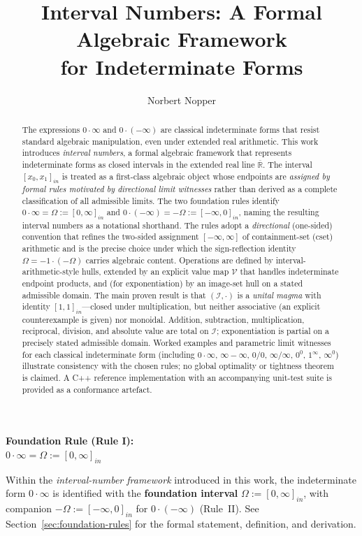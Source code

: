 \documentclass[11pt,a4paper]{article}
\title{Interval Numbers: A Formal Algebraic Framework\\
for Indeterminate Forms}
\author{Norbert Nopper}
\date{}
\theoremstyle{paperdef}
\newcommand{\Rext}{\overline{\mathbb{R}}}
\newcommand{\Iset}{\mathcal{I}}
\newcommand{\inI}[1]{[#1]_{in}}
\newcommand{\V}{\mathcal{V}}
\begin{document}
\maketitle

\begin{center}
\textbf{Foundation Rule (Rule I):}\\[0.5em]
$0 \cdot \infty = \Omega := \inI{0, \infty}$
\end{center}

\noindent
Within the \emph{interval-number framework} introduced in this work, the
indeterminate form $0 \cdot \infty$ is identified with the
\textbf{foundation interval} $\Omega := \inI{0, \infty}$, with companion
$-\Omega := \inI{-\infty, 0}$ for $0 \cdot (-\infty)$ (Rule~II).
See Section~\ref{sec:foundation-rules} for the formal statement,
definition, and derivation.

\begin{abstract}
The expressions $0 \cdot \infty$ and $0 \cdot (-\infty)$ are classical
indeterminate forms that resist standard algebraic manipulation, even
under extended real arithmetic. This work introduces \emph{interval
numbers}, a formal algebraic framework that represents indeterminate
forms as closed intervals in the extended real line $\Rext$. The
interval $\inI{x_0, x_1}$ is treated as a first-class algebraic object
whose endpoints are \emph{assigned by formal rules motivated by
directional limit witnesses} rather than derived as a complete
classification of all admissible limits. The two foundation rules
identify $0 \cdot \infty = \Omega := \inI{0, \infty}$ and
$0 \cdot (-\infty) = -\Omega := \inI{-\infty, 0}$, naming the resulting
interval numbers as a notational shorthand. The rules adopt a
\emph{directional} (one-sided) convention that refines the two-sided
assignment $[-\infty, \infty]$ of containment-set (cset) arithmetic
and is the precise choice under which the sign-reflection identity
$\Omega = -1 \cdot (-\Omega)$ carries algebraic content.
Operations are defined by
interval-arithmetic-style hulls, extended by an explicit value map
$\V$ that handles indeterminate endpoint products, and (for
exponentiation) by an image-set hull on a stated admissible domain.
The main proven result is that $(\Iset, \cdot)$ is a \emph{unital
magma} with identity $\inI{1,1}$---closed under multiplication, but
neither associative (an explicit counterexample is given) nor
monoidal. Addition, subtraction, multiplication, reciprocal, division,
and absolute value are total on $\Iset$; exponentiation is partial on a
precisely stated admissible domain. Worked examples and parametric
limit witnesses for each classical indeterminate form (including
$0\cdot\infty$, $\infty-\infty$, $0/0$, $\infty/\infty$, $0^0$,
$1^\infty$, $\infty^0$) illustrate consistency with the chosen rules;
no global optimality or tightness theorem is claimed. A C++ reference
implementation with an accompanying unit-test suite is provided as a
conformance artefact.
\end{abstract}
\end{document}
